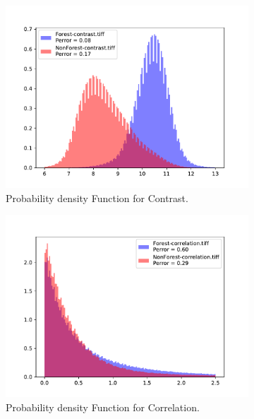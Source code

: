 \begin{figure}[H]
\begin{subfigure}[b]{0.4\linewidth}
    \includegraphics[width=\linewidth]{Chapter5/SENTINEL1/Sigma0/contrast_histogram.pdf}
     \caption{Probability density Function for Contrast.}
  \end{subfigure}
  \centering
  \begin{subfigure}[b]{0.4\linewidth}
    \includegraphics[width=\linewidth]{Chapter5/SENTINEL1/Sigma0/correlation_histogram.pdf}
     \caption{Probability density Function for Correlation.}
  \end{subfigure}
  \centering
  \begin{subfigure}[b]{0.4\linewidth}

\end{subfigure}
\end{figure}
